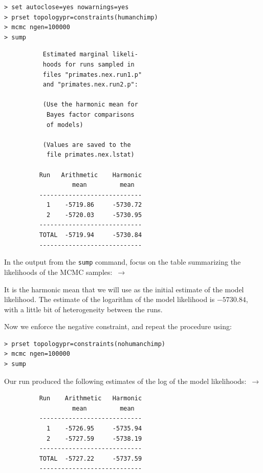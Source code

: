 \documentclass[12pt]{book}
\newcommand{\ttt}[1]{\texttt{#1}}
\begin{document}
\begin{singlespacing}\small
\begin{verbatim}
> set autoclose=yes nowarnings=yes
> prset topologypr=constraints(humanchimp)
> mcmc ngen=100000
> sump
\end{verbatim}
\end{singlespacing}
\normalsize

\begin{figure}\singlespacing\footnotesize
\vspace{-18mm}
\begin{verbatim}
     Estimated marginal likeli-
     hoods for runs sampled in 
     files "primates.nex.run1.p"
     and "primates.nex.run2.p":

     (Use the harmonic mean for 
      Bayes factor comparisons 
      of models)
 
     (Values are saved to the 
      file primates.nex.lstat)

    Run   Arithmetic    Harmonic 
             mean         mean
    ----------------------------
      1    -5719.86     -5730.72
      2    -5720.03     -5730.95
    ----------------------------
    TOTAL  -5719.94     -5730.84
    ----------------------------
\end{verbatim}\end{figure}

In the output from the \ttt{sump} command, focus on the table summarizing the likelihoods of the
MCMC samples:~$\rightarrow$

It is the harmonic mean that we will use as the initial estimate of the model likelihood. The
estimate of the logarithm of the model likelihood is $-5730.84$, with a little bit of heterogeneity
between the runs.\vspace{4mm}

Now we enforce the negative constraint, and repeat the procedure using:

\begin{singlespacing}\small
\begin{verbatim}
> prset topologypr=constraints(nohumanchimp)
> mcmc ngen=100000
> sump
\end{verbatim}
\normalsize\end{singlespacing}

Our run produced the following estimates of the log of the model likelihoods:~$\rightarrow$

\begin{figure}\singlespacing\footnotesize
\vspace{-23mm}
\begin{verbatim}
    Run    Arithmetic   Harmonic 
             mean         mean
    ----------------------------
      1    -5726.95     -5735.94
      2    -5727.59     -5738.19
    ----------------------------
    TOTAL  -5727.22     -5737.59
    ----------------------------

\end{verbatim}\end{figure}
\end{document}
